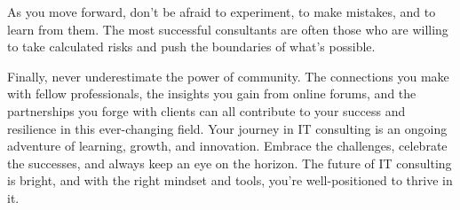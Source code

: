 As you move forward, don't be afraid to experiment, to make mistakes, and to learn from them. The most successful consultants are often those who are willing to take calculated risks and push the boundaries of what's possible.

Finally, never underestimate the power of community. The connections you make with fellow professionals, the insights you gain from online forums, and the partnerships you forge with clients can all contribute to your success and resilience in this ever-changing field.
%
Your journey in IT consulting is an ongoing adventure of learning, growth, and innovation. Embrace the challenges, celebrate the successes, and always keep an eye on the horizon. The future of IT consulting is bright, and with the right mindset and tools, you're well-positioned to thrive in it.

